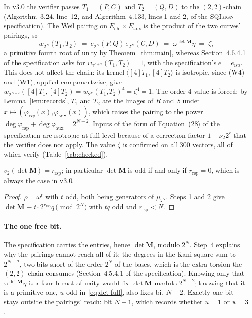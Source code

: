 \documentclass[version=submission]{iacrcc}
\newcommand{\ers}{e_{\mathrm{rsp}}}
\newcommand{\rrs}{r_{\mathrm{rsp}}}
\newcommand{\Mm}{\mathbf{M}}
\newcommand{\Echl}{E_{\mathrm{chl}}}
\newcommand{\Eaux}{E_{\mathrm{aux}}}
\newcommand{\SQIsign}{{SQI}\textsc{sign}}
\begin{document}
\begin{remark}
\label{rem:isotropy}
In v3.0 the verifier passes $T_1 = (P, C)$ and $T_2 = (Q, D)$ to the
$(2,2)$-chain (Algorithm~3.24, line~12, and Algorithm~4.133, lines 1
and 2, of the {\SQIsign} specification).
The Weil pairing on $\Echl \times \Eaux$
is the product of the two curves' pairings, so
\[
  w_{2^N}(T_1, T_2) \;=\; e_{2^N}(P, Q)\, e_{2^N}(C, D)
  \;=\; \omega^{\det \Mm} \eta \;=\; \zeta ,
\]
a primitive fourth root of unity by Theorem~\ref{thm:main}, whereas
Section~4.5.4.1 of the specification asks for
$w_{2^{e+2}}(T_1, T_2) = 1$, with the specification's $e = \ers$. This does not affect the
chain: its kernel $\langle [4] T_1, [4] T_2 \rangle$ is isotropic, since
(W4) and (W1), applied componentwise, give
$w_{2^{N-2}}([4] T_1, [4] T_2) = w_{2^N}(T_1, T_2)^4 = \zeta^4 = 1$.
The order-4 value is forced: by Lemma~\ref{lem:records}, $T_1$ and $T_2$
are the images of $R$ and $S$ under
$x \mapsto (\varphi_{\mathrm{rsp}}(x), \varphi_{\mathrm{aux}}(x))$, which raises the pairing to the power $\deg \varphi_{\mathrm{rsp}} + \deg \varphi_{\mathrm{aux}} = 2^{N-2}$.
Inputs of the form of Equation~(28) of the specification are isotropic
at full level because of a correction factor $1 - \nu_2 2^e$ that the
verifier does not apply. The value $\zeta$ is confirmed on all 300
vectors, all of which verify (Table~\ref{tab:checked}).
\end{remark}

\begin{corollary}
\label{cor:valuation}
$v_2(\det \Mm) = \rrs$; in particular $\det \Mm$ is odd if and only if
$\rrs = 0$, which is always the case in v3.0.
\end{corollary}

\begin{proof}
$\rho = \omega^{t}$ with $t$ odd, both being generators of $\mu_{2^N}$.
Steps 1 and 2 give $\det \Mm \equiv t \cdot 2^{\rrs} q \pmod{2^N}$ with
$t q$ odd and $\rrs < N$.
\end{proof}

\paragraph{The one free bit.}
The specification carries the entries, hence $\det \Mm$, modulo $2^N$.
Step~4 explains why the pairings cannot reach all of it: the degrees in
the Kani square sum to $2^{N - 2}$, two bits short of the order $2^N$ of
the bases, which is the extra torsion the $(2,2)$-chain consumes
(Section~4.5.4.1 of the specification). Knowing only that
$\omega^{\det \Mm} \eta$ is a fourth root of unity would fix
$\det \Mm$ modulo $2^{N - 2}$; knowing that it is a primitive one, $u$
odd in~\eqref{eq:det-full}, also fixes bit $N - 2$. Exactly one bit
stays outside the pairings' reach: bit $N - 1$, which records whether
$u = 1$ or $u = 3$.
\end{document}

